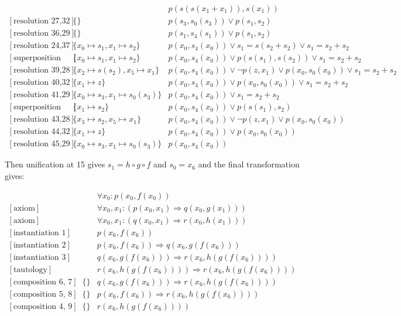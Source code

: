 \documentclass[onehalfspacing]{article}
\begin{document}
\begin{landscape}
\begin{align}
		[\text{forward demodulation 34,33}] &&	 p(s(s(x_1 + x_1)),s(x_1)) \\
		[\text{resolution 27,32}] &\{\}&	 p(s_3,s_0(s_3)) \vee p(s_1,s_2) \\
		[\text{resolution 36,29}] &\{\}&	 p(s_1, s_4(s_1))\vee p(s_1,s_2) \\
		[\text{resolution 24,37}] &\{x_0\mapsto s_1, x_1\mapsto s_2\}& 	p(x_0, s_4(x_0))\vee s_1 = s(s_2 + s_2) \vee s_1 = s_2 + s_2 \\
		[\text{superposition 25,38}] &\{x_0\mapsto s_1, x_1\mapsto s_2\}& 	 p(x_0, s_4(x_0))\vee p(s(s_1),s(s_2)) \vee s_1 = s_2 + s_2 \\
		[\text{resolution 39,28}] &\{x_2\mapsto s(s_2), x_5\mapsto x_1\}& 	 p(x_0, s_4(x_0))\vee \neg p(z,x_1) \vee p(x_0,s_0(x_0)) \vee s_1 = s_2 + s_2 \\
		[\text{resolution 40,32}] &\{x_1\mapsto z\}& 	 p(x_0, s_4(x_0))\vee p(x_0,s_0(x_0)) \vee s_1 = s_2 + s_2 \\
		[\text{resolution 41,29}] &\{x_0\mapsto s_3, x_1\mapsto s_0(s_3)\}& 	 p(x_0, s_4(x_0))\vee s_1 = s_2 + s_2 \\
		[\text{superposition 42,30}] &\{x_1\mapsto s_2\}& 	p(x_0, s_4(x_0))\vee p(s(s_1),s_2)\\
		[\text{resolution 43,28}] &\{x_3\mapsto s_2, x_5\mapsto x_1\}& 	 p(x_0, s_4(x_0))\vee\neg p(z,x_1) \vee p(x_0,s_0(x_0)) \\
		[\text{resolution 44,32}] &\{x_1\mapsto z\}& 	 p(x_0, s_4(x_0))\vee p(x_0,s_0(x_0)) \\
		[\text{resolution 45,29}] &\{x_0\mapsto s_3, x_1\mapsto s_0(s_3)\}& p(x_0, s_4(x_0))
	\end{align}
\end{landscape}

Then unification at 15 gives $s_1 = h\circ g\circ f$ and $s_0 = x_6$ and the final transformation gives: 


\setcounter{equation}{0}
\begin{align}
	[\text{axiom}] && \forall x_0: p(x_0,f(x_0))\\
	[\text{axiom}] && \forall x_0, x_1 : (p(x_0,x_1) \Rightarrow q(x_0,g(x_1)))\\
	[\text{axiom}] && \forall x_0, x_1 : (q(x_0,x_1) \Rightarrow r(x_0,h(x_1)))\\
	[\text{instantiation 1}] && p(x_6, f(x_6))\\
	[\text{instantiation 2}] && p(x_6, f(x_6))\Rightarrow q(x_6,g(f(x_6))) \\
	[\text{instantiation 3}] && q(x_6, g(f(x_6)))\Rightarrow r(x_6,h(g(f(x_6)))) \\
	[\text{tautology}] && r(x_6, h(g(f(x_6))))\Rightarrow r(x_6,h(g(f(x_6))))\\
	[\text{composition 6, 7}] &\{\}&q(x_6, g(f(x_6)))\Rightarrow r(x_6,h(g(f(x_6))))\\
	[\text{composition 5, 8}] &\{\}&p(x_6,f(x_6))\Rightarrow r(x_6, h(g(f(x_6))))\\
	[\text{composition 4, 9}] &\{\}&r(x_6, h(g(f(x_6))))
\end{align}




\pagebreak


\end{document}
